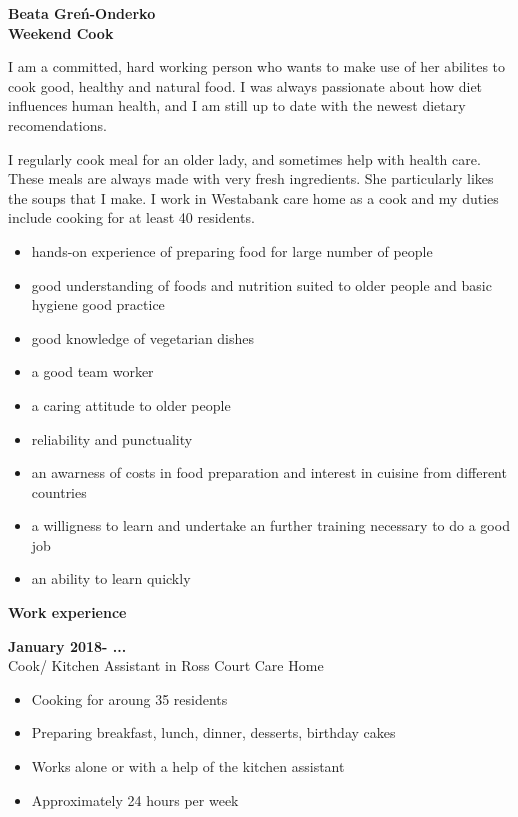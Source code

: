 \documentclass[a4paper,12pt,final]{memoir}
\newcommand{\SmallSep}{\vspace{0.5em}}
\newenvironment{Career Profile}
	{\ignorespaces\textbf{\color{ForestGreen} Career Profile}}
	{\Sep\ignorespacesafterend}
\newenvironment{Key experience}
	{\ignorespaces\textbf{\color{ForestGreen} Key experience}}
	{\Sep\ignorespacesafterend}
\newcommand{\CVSection}[1]
	{\Large\textbf{#1}\par
	\SmallSep\normalsize\normalfont}
\newcommand{\CVItem}[1]
	{\textbf{\color{ForestGreen} #1}}
\begin{document}
\Huge\bfseries {\color{ForestGreen} Beata Greń-Onderko} \\
\Large\bfseries Weekend Cook\\

\normalsize\normalfont

\begin{Career Profile} I am a committed, hard working person who wants to make
use of her abilites to cook good, healthy and natural food. I was always
passionate about how diet influences human health, and I am still up to
date with the newest dietary recomendations.

\end{Career Profile}

\begin{Key experience}
I regularly cook meal for an older lady, and sometimes help
with health care. These meals are always made with very fresh ingredients.
She particularly likes the soups that I make. I work in Westabank care
home as a cook and my duties include cooking for at least 40 residents.
\begin{itemize}
\item{hands-on experience of preparing food for large number of people}
\item{good understanding of foods and nutrition suited to older people and
basic hygiene good practice}
\item{good knowledge of vegetarian dishes}
\item{a good team worker}
\item{a caring attitude to older people}
\item{reliability and punctuality}
\item{an awarness of costs in food preparation and interest in cuisine from
different countries}
\item{a willigness to learn and undertake an further training necessary to
do a good job}
\item{an ability to learn quickly}
\end{itemize}

\end{Key experience}

\CVSection{Work experience}

\CVItem{January 2018- ...}\\
Cook/ Kitchen Assistant in Ross Court Care Home \\
\begin{itemize}
\item{Cooking for aroung 35 residents}
\item{Preparing breakfast, lunch, dinner, desserts, birthday cakes}
\item{Works alone or with a help of the kitchen assistant}
\item{Approximately 24 hours per week}
\end{itemize}
\end{document}
